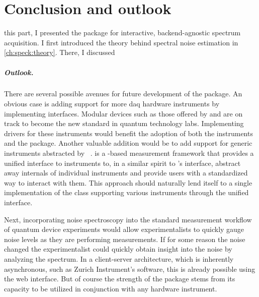 \chapter{Conclusion and outlook}\label{ch:speck:conclusion}
 this part, I presented the \pyspeck \python package for interactive, backend-agnostic spectrum acquisition.
I first introduced the theory behind spectral noise estimation in \cref{ch:speck:theory}.
There, I discussed

\paragraph{Outlook.\label{par:speck:outlook}}
There are several possible avenues for future development of the \pyspeck package.
An obvious case is adding support for more \gls{daq} hardware instruments by implementing  interfaces.
Modular devices such as those offered by  and  are on track to become the new standard in quantum technology labs.
Implementing drivers for these instruments would benefit the adoption of both the instruments and the \pyspeck package.
Another valuable addition would be to add support for generic instruments abstracted by \qumada~\cite{Huckemann2025a}.
\qumada is a \qcodes-based measurement framework that provides a unified interface to instruments to, in a similar spirit to \pyspeck's  interface, abstract away internals of individual instruments and provide users with a standardized way to interact with them.
This approach should naturally lend itself to a single implementation of the  class supporting various instruments through the unified \qumada interface.

Next, incorporating noise spectroscopy into the standard measurement workflow of quantum device experiments would allow experimentalists to quickly gauge noise levels as they are performing measurements.
If for some reason the noise changed
the experimentalist could quickly obtain insight into the noise by analyzing the spectrum.
In a client-server architecture, which is inherently asynchronous, such as Zurich Instrument's  software, this is already possible using the web interface.
But of course the strength of the \pyspeck package stems from its capacity to be utilized in conjunction with any hardware instrument.


